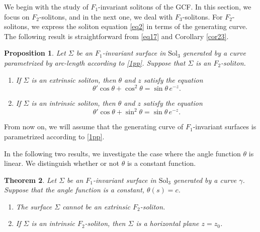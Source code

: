\documentclass[a4paper,12pt]{amsart}
\theoremstyle{plain}
\newtheorem{theorem}{Theorem}[section]
\newtheorem{proposition}[theorem]{Proposition}
\theoremstyle{definition}
\def\sol{\text{Sol}_3}
\begin{document}
We begin with the study of $F_1$-invariant solitons of the GCF. In this section, we focus on $F_2$-solitons, and in the next one, we deal with $F_3$-solitons. For $F_2$-solitons, we express the soliton equation \eqref{eq2} in terms of the generating curve. The following result is straightforward from \eqref{eq17} and Corollary \ref{cor23}.

 

\begin{proposition} \label{pr61}
Let $\Sigma$ be an $F_1$-invariant surface in $\sol$ generated by a curve parametrized by arc-length according to \eqref{1pp}. 
Suppose that $\Sigma$ is an $F_2$-soliton.
\begin{enumerate}
 \item If $\Sigma$ is an extrinsic soliton, then $\theta$ and $z$ satisfy the equation
 \begin{equation}\label{121}
 \theta' \cos\theta+ \cos^2\theta = \sin\theta\, e^{-z}.
 \end{equation}
 \item If $\Sigma$ is an intrinsic soliton, then $\theta$ and $z$ satisfy the equation
 \begin{equation}\label{122}
 \theta'\cos\theta + \sin^2\theta = \sin\theta\, e^{-z}.
 \end{equation}
\end{enumerate}
\end{proposition}


 
From now on, we will assume that the generating curve of $F_1$-invariant surfaces is parametrized according to \eqref{1pp}. 
 

 


In the following two results, we investigate the case where the angle function $\theta$ is linear. We distinguish whether or not $\theta$ is a constant function. 

\begin{theorem}\label{t52}
Let $\Sigma$ be an $F_1$-invariant surface in $\sol$ generated by a curve $\gamma$. Suppose that the angle function is a constant, $\theta(s)=c$.
\begin{enumerate}
 \item The surface $\Sigma$ cannot be an extrinsic $F_2$-soliton.
 \item If $\Sigma$ is an intrinsic $F_2$-soliton, then $\Sigma$ is a horizontal plane $z = z_0$.
\end{enumerate}
\end{theorem}
\end{document}
